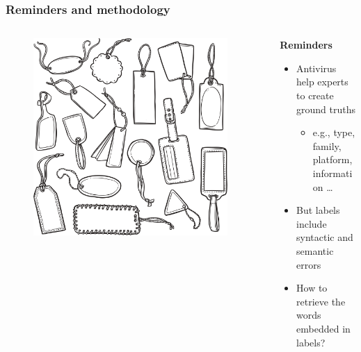 \begin{frame}
    \frametitle{Reminders and methodology}

    \begin{columns}
        \begin{column}{0.3\textwidth}
            \begin{figure}[!ht]
                \includegraphics[width=0.95\textwidth]{figures/euphony/tag.jpg}
            \end{figure}
        \end{column}

        \begin{column}{0.81\textwidth}
            \begin{block}{}
                \centering
                \textbf{Reminders}
            \end{block}
            \begin{itemize}
                \item Antivirus help experts to create ground truths
                \begin{itemize}
                    \item e.g., type, family, platform, information \ldots
                \end{itemize}
                \item But labels include syntactic and semantic errors
                \item How to retrieve the words embedded in labels?
            \end{itemize}


\end{column}
\end{columns}
\end{frame}
